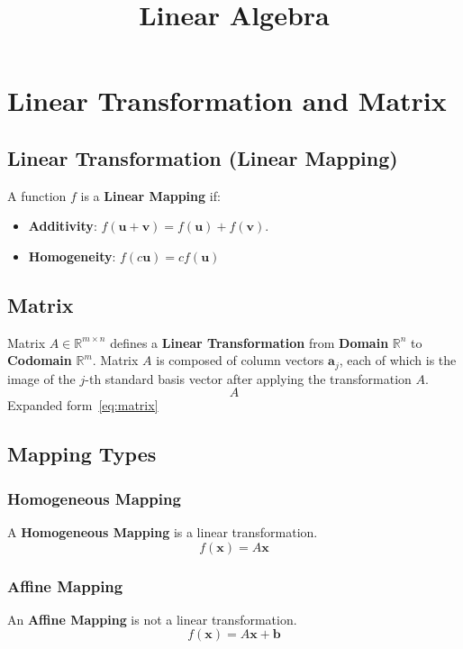 \documentclass{article}
\title{Linear Algebra}
\date{}
\begin{document}
\maketitle

\tableofcontents

\newpage
\section{Linear Transformation and Matrix}

\subsection{Linear Transformation (Linear Mapping)}

A function $f$ is a \textbf{Linear Mapping} if:
\begin{itemize}
    \item \textbf{Additivity}: $f(\mathbf{u}+\mathbf{v}) = f(\mathbf{u}) + f(\mathbf{v})$.
    \item \textbf{Homogeneity}: $f(c\mathbf{u}) = c f(\mathbf{u})$
\end{itemize}

\subsection{Matrix}

Matrix $A \in \mathbb{R}^{m \times n}$ defines a \textbf{Linear Transformation} from \textbf{Domain} $\mathbb{R}^n$ to \textbf{Codomain} $\mathbb{R}^m$.
\newline
Matrix $A$ is composed of column vectors $\mathbf{a}_j$, each of which is the image of the $j$-th standard basis vector after applying the transformation $A$.
\[
    A
\]
Expanded form~\ref{eq:matrix}

\subsection{Mapping Types}

\subsubsection{Homogeneous Mapping}
A \textbf{Homogeneous Mapping} is a linear transformation.
\[
    f(\mathbf{x}) = A\mathbf{x}
\]

\subsubsection{Affine Mapping}
An \textbf{Affine Mapping} is not a linear transformation.
\[
    f(\mathbf{x}) = A\mathbf{x} + \mathbf{b}
\]
\end{document}
